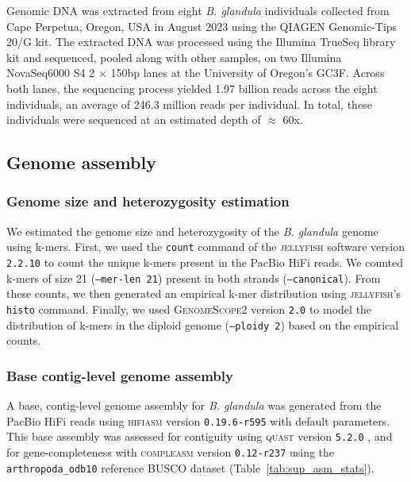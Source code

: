 \documentclass[11pt]{article}
\newcommand{\bgla}{\textit{B. glandula}\xspace}
\begin{document}
Genomic DNA was extracted from eight \bgla{} individuals collected
from Cape Perpetua, Oregon, USA in August 2023 using the QIAGEN Genomic-Tips
20/G kit. The extracted DNA was processed using the Illumina TrueSeq library
kit and sequenced, pooled along with other samples, on two Illumina NovaSeq6000
S4 2 $\times$ 150bp lanes at the University of Oregon's GC3F. Across both lanes,
the sequencing process yielded 1.97 billion reads across the eight individuals,
an average of 246.3 million reads per individual. In total, these individuals
were sequenced at an estimated depth of $\approx$ 60x.

\subsection*{Genome assembly}\label{sec:methods_assembly}

\subsubsection*{Genome size and heterozygosity estimation}

We estimated the genome size and heterozygosity of the \bgla{}
genome using k-mers. First, we used the \texttt{count} command of the
\textsc{jellyfish} software version \texttt{2.2.10} \citep{marcais_fast_2011}
to count the unique k-mers present in the PacBio HiFi reads. We counted k-mers
of size 21 (\texttt{--mer-len 21}) present in both strands (\texttt{--canonical}).
From these counts, we then generated an empirical k-mer distribution using
\textsc{jellyfish}'s \texttt{histo} command. Finally, we used
\textsc{GenomeScope2} version \texttt{2.0} \citep{ranallo-benavidez_genomescope_2020}
to model the distribution of k-mers in the diploid genome (\texttt{--ploidy 2})
based on the empirical counts.

\subsubsection*{Base contig-level genome assembly}

A base, contig-level genome assembly for \bgla{} was generated from
the PacBio HiFi reads using \textsc{hifiasm} version \texttt{0.19.6-r595}
\citep{cheng_haplotype-resolved_2021,cheng_haplotype-resolved_2022} with default
parameters. This base assembly was assessed for contiguity using \textsc{quast}
version \texttt{5.2.0} \citep{gurevich_quast_2013}, and for gene-completeness with
\textsc{compleasm} version \texttt{0.12-r237} \citep{huang_compleasm_2023} using
the \texttt{arthropoda\_odb10} reference \textsc{BUSCO} dataset \citep{simao_busco_2015,
manni_busco_2021,tegenfeldt_orthodb_2025} (Table~\ref{tab:sup_asm_stats}).
\end{document}
